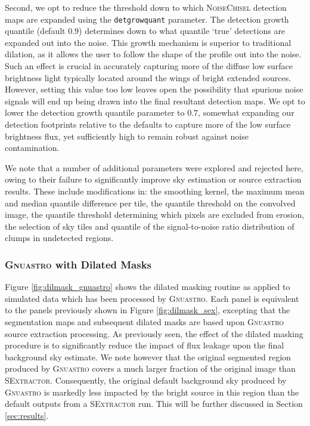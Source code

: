 \documentclass[fleqn,usenatbib,useAMS]{mnras}
\newcommand*{\SExtractor}{\textsc{SExtractor}\xspace}
\newcommand*{\Gnuastro}{\textsc{Gnuastro}\xspace}
\newcommand*{\NoiseChisel}{\textsc{NoiseChisel}\xspace}
\begin{document}
Second, we opt to reduce the threshold down to which \NoiseChisel detection maps are expanded using the \texttt{detgrowquant} parameter. The detection growth quantile (default $0.9$) determines down to what quantile `true' detections are expanded out into the noise. This growth mechanism is superior to traditional dilation, as it allows the user to follow the shape of the profile out into the noise. Such an effect is crucial in accurately capturing more of the diffuse low surface brightness light typically located around the wings of bright extended sources. However, setting this value too low leaves open the possibility that spurious noise signals will end up being drawn into the final resultant detection maps. We opt to lower the detection growth quantile parameter to $0.7$, somewhat expanding our detection footprints relative to the defaults to capture more of the low surface brightness flux, yet sufficiently high to remain robust against noise contamination. 

We note that a number of additional parameters were explored and rejected here, owing to their failure to significantly improve sky estimation or source extraction results. These include modifications in: the smoothing kernel, the maximum mean and median quantile difference per tile, the quantile threshold on the convolved image, the quantile threshold determining which pixels are excluded from erosion, the selection of sky tiles and quantile of the signal-to-noise ratio distribution of clumps in undetected regions. 

\subsubsection{\Gnuastro with Dilated Masks}
\label{sec:gnuastrodilated}
Figure \ref{fig:dilmask_gnuastro} shows the dilated masking routine as applied to simulated data which has been processed by \Gnuastro. Each panel is equivalent to the panels previously shown in Figure \ref{fig:dilmask_sex}, excepting that the segmentation maps and subsequent dilated masks are based upon \Gnuastro source extraction processing. As previously seen, the effect of the dilated masking procedure is to significantly reduce the impact of flux leakage upon the final background sky estimate. We note however that the original segmented region produced by \Gnuastro covers a much larger fraction of the original image than \SExtractor. Consequently, the original default background sky produced by \Gnuastro is markedly less impacted by the bright source in this region than the default outputs from a \SExtractor run. This will be further discussed in Section \ref{sec:results}.
\end{document}
